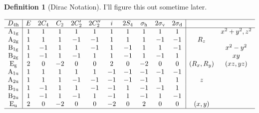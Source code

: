 \documentclass[a4paper]{tufte-handout}
\theoremstyle{definition}
\newtheorem{definition}{Definition}
\begin{document}
\begin{definition}[Dirac Notation]
  I'll figure this out sometime later.
  
\end{definition}

$$\begin{array}{c|cccccccccc|cc} \hline
  D_\mathrm{4h} & E & 2C_4 & C_2 & 2C_2' & 2C_2'' & i & 2S_4 & \sigma_\mathrm{h} & 2\sigma_\mathrm{v} & 2\sigma_\mathrm{d} & & \\ \hline
  \mathrm{A_{1g}} & 1 & 1 & 1 & 1 & 1 & 1 & 1 & 1 & 1 & 1 & & x^2+y^2,z^2 \\
  \mathrm{A_{2g}} & 1 & 1 & 1 & -1 & -1 & 1 & 1 & 1 & -1 & -1 & R_z & \\
  \mathrm{B_{1g}} & 1 & -1 & 1 & 1 & -1 & 1 & -1 & 1 & 1 & -1 & & x^2-y^2 \\
  
  \mathrm{B_{2g}} & 1 & -1 & 1 & -1 & 1 & 1 & -1 & 1 & -1 & 1 & & xy \\
  \mathrm{E_g} & 2 & 0 & -2 & 0 & 0 & 2 & 0 & -2 & 0 & 0 & (R_x,R_y) & (xz,yz) \\
  \mathrm{A_{1u}} & 1 & 1 & 1 & 1 & 1 & -1 & -1 & -1 & -1 & -1 & & \\
  \mathrm{A_{2u}} & 1 & 1 & 1 & -1 & -1 & -1 & -1 & -1 & 1 & 1 & z & \\
  \mathrm{B_{1u}} & 1 & -1 & 1 & 1 & -1 & -1 & 1 & -1 & -1 & 1 & & \\
  \mathrm{B_{2u}} & 1 & -1 & 1 & -1 & 1 & -1 & 1 & -1 & 1 & -1 & & \\
  \mathrm{E_u} & 2 & 0 & -2 & 0 & 0 & -2 & 0 & 2 & 0 & 0 & (x,y) & \\ \hline
  \end{array}$$
  




\end{document}
